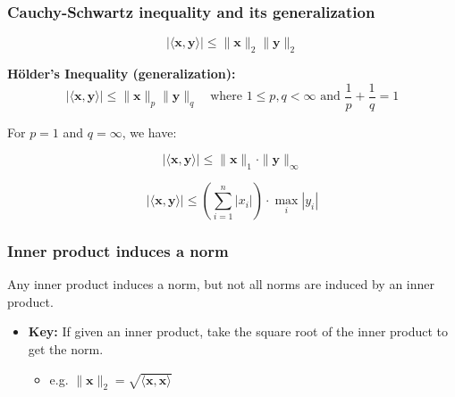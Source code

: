 \subsubsection{Cauchy-Schwartz inequality and its generalization}
\begin{definition}
        \begin{equation}
            | \langle \mathbf{x}, \mathbf{y} \rangle | \leq \|\mathbf{x}\|_2 \|\mathbf{y}\|_2    
        \end{equation}
        \vspace{1em}

        \textbf{Hölder's Inequality (generalization):}
        \begin{equation}
            | \langle \mathbf{x}, \mathbf{y} \rangle | \leq \|\mathbf{x}\|_p \|\mathbf{y}\|_q \quad \text{where } 1 \leq p, q < \infty \text{ and } \frac{1}{p} + \frac{1}{q} = 1
        \end{equation}
\end{definition}

\begin{example}
    For \( p = 1 \) and \( q = \infty \), we have:

    \[
    | \langle \mathbf{x}, \mathbf{y} \rangle | \leq \|\mathbf{x}\|_1 \cdot \|\mathbf{y}\|_\infty
    \]

    \[
    | \langle \mathbf{x}, \mathbf{y} \rangle | \leq \left( \sum_{i=1}^{n} |x_i| \right) \cdot \max_i |y_i|
    \]
\end{example}

\subsubsection{Inner product induces a norm}
\begin{definition}
    Any inner product induces a norm, but not all norms are induced by an inner product.
    \begin{itemize}
        \item \textbf{Key:} If given an inner product, take the square root of the inner product to get the norm.
        \begin{itemize}
            \item e.g. $\lVert \mathbf{x} \rVert_2 = \sqrt{\langle \mathbf{x}, \mathbf{x} \rangle}$
        \end{itemize}
    \end{itemize}
\end{definition}

